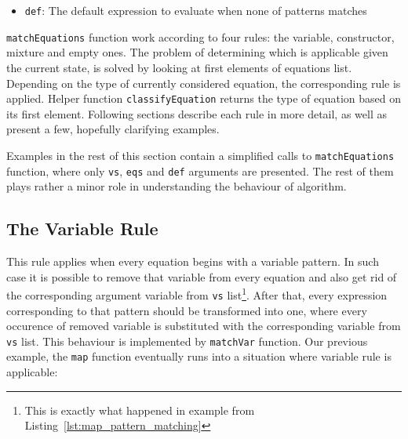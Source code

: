 \documentclass[12pt,a4paper]{report}
\begin{document}
\begin{itemize}
\vspace*{0.2in}
\begin{code}[style=haskell]
ECaseConstr ((EConstr 3 2 (ENum 1)) (EConstr 2 0))
            [(PConstr 2 0 [], ENum 0),
             (PConstr 3 2 [PVar x, PVar xs], EVar x)]
\end{code}

\texttt{Pattern} type instances on the other hand represents patterns itself.
Patterns might be numbers, variables, constructors or special entities standing
for patterns chosen when none of other branches match. Below, the definition of
\texttt{Pattern} type is presented:

\vspace*{0.2in}
\begin{code}[style=haskell]
data Pattern = PNum Int
             | PVar Name
             | PChar Int
             | PConstrName Name [Pattern]
             | PConstr Int Int [Pattern]
             | PDefault
\end{code}


  \item \texttt{def}: The default expression to evaluate when none of patterns
    matches
\end{itemize}

\texttt{matchEquations} function work according to four rules: the variable,
constructor, mixture and empty ones. The problem of determining which is
applicable given the current state, is solved by looking at first elements of
equations list. Depending on the type of currently considered equation, the
corresponding rule is applied. Helper function \texttt{classifyEquation}
returns the type of equation based on its first element. Following sections
describe each rule in more detail, as well as present a few, hopefully
clarifying examples.

Examples in the rest of this section contain a simplified calls to
\texttt{matchEquations} function, where only \texttt{vs}, \texttt{eqs} and
\texttt{def} arguments are presented. The rest of them plays rather a minor
role in understanding the behaviour of algorithm.


\subsection{The Variable Rule}
This rule applies when every equation begins with a variable pattern. In such
case it is possible to remove that variable from every equation and also get
rid of the corresponding argument variable from \texttt{vs} list\footnote{This
is exactly what happened in example from
Listing~\ref{lst:map_pattern_matching}}. After that, every expression
corresponding to that pattern should be transformed into one, where every
occurence of removed variable is substituted with the corresponding variable
from \texttt{vs} list. This behaviour is implemented by \texttt{matchVar}
function.  Our previous example, the \texttt{map} function eventually runs into
a situation where variable rule is applicable:
\end{document}
